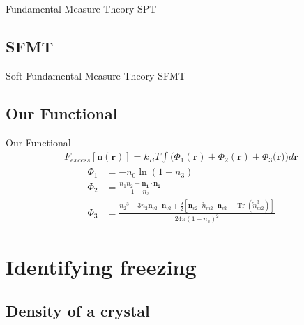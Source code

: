 \documentclass{beamer}
\renewcommand{\vec}[1]{\mathbf{#1}}
\begin{document}
\begin{frame}{Fundamental Measure Theory}
  SPT
\end{frame}

\subsection*{SFMT}
\begin{frame}{Soft Fundamental Measure Theory}
  SFMT
\end{frame}

\subsection*{Our Functional}
\begin{frame}{Our Functional}
    \begin{align}\label{eq:Fexfunctional}
        F_{excess}[\text{n}(\vec{r})]=k_BT\int(\Phi_1(\vec{r})+\Phi_2(\vec{r})+\Phi_3(\vec{r}{)) d}\vec{r}
     \end{align}
     \begin{align}
         \Phi_1 &= -n_{0}\ln(1-n_{3}) \\
         \Phi_2 &= \frac{n_{1}n_{2}-\vec{n_{1}}\cdot\vec{n_{2}}}{1-n_{3}} \\
         \Phi_3 &= \frac{{n_2}^3-3n_2\vec{n}_{v2}\cdot\vec{n}_{v2}+\frac{9}{2}[\vec{n}_{v2}\cdot{\overleftrightarrow{n}_{m2}}\cdot{\vec{n}_{v2}}-\operatorname{Tr}({\overleftrightarrow{n}^3_{m2}})]}{24\pi(1-n_3)^2}  
      \end{align} 
\end{frame}

\section*{Identifying freezing}
\subsection*{Density of a crystal}
\end{document}
